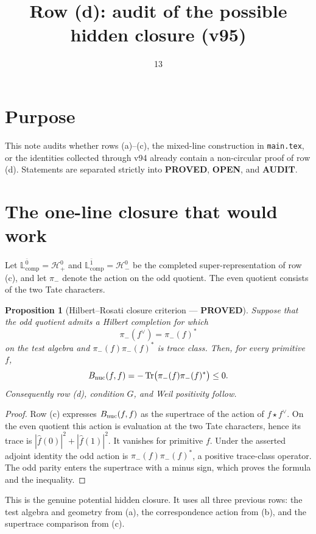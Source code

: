 \documentclass[11pt]{article}
\title{Row (d): audit of the possible hidden closure (v95)}
\date{13}
\newcommand{\PROVED}{\textcolor{green!40!black}{\textbf{PROVED}}}
\newcommand{\OPEN}{\textcolor{red!70!black}{\textbf{OPEN}}}
\newcommand{\AUDIT}{\textcolor{orange!70!black}{\textbf{AUDIT}}}
\newtheorem{proposition}{Proposition}
\begin{document}
\maketitle

\section*{Purpose}
This note audits whether rows (a)--(c), the mixed-line construction in
\texttt{main.tex}, or the identities collected through v94 already contain a
non-circular proof of row (d).  Statements are separated strictly into
\PROVED, \OPEN, and \AUDIT.

\section{The one-line closure that would work}

Let $\mathbb L_{\mathrm{comp}}^{\bar0}=\mathcal H_+^0$ and
$\mathbb L_{\mathrm{comp}}^{\bar1}=\mathcal H_-^0$ be the completed
super-representation of row (c), and let $\pi_-$ denote the action on the odd
quotient.  The even quotient consists of the two Tate characters.

\begin{proposition}[Hilbert--Rosati closure criterion --- \PROVED]
Suppose that the odd quotient admits a Hilbert completion for which
\[
 \pi_-(f^\vee)=\pi_-(f)^*
\]
on the test algebra and $\pi_-(f)\pi_-(f)^*$ is trace class.  Then, for every
primitive $f$,
\[
 B_{\rm nuc}(f,f)=-\operatorname{Tr}
 \bigl(\pi_-(f)\pi_-(f)^*\bigr)\leq0.
\]
Consequently row (d), condition $G$, and Weil positivity follow.
\end{proposition}

\begin{proof}
Row (c) expresses $B_{\rm nuc}(f,f)$ as the supertrace of the action of
$f\star f^\vee$.  On the even quotient this action is evaluation at the two
Tate characters, hence its trace is
$|\widehat f(0)|^2+|\widehat f(1)|^2$.  It vanishes for primitive $f$.
Under the asserted adjoint identity the odd action is
$\pi_-(f)\pi_-(f)^*$, a positive trace-class operator.  The odd parity enters
the supertrace with a minus sign, which proves the formula and the inequality.
\end{proof}

This is the genuine potential hidden closure.  It uses all three previous
rows: the test algebra and geometry from (a), the correspondence action from
(b), and the supertrace comparison from (c).
\end{document}
